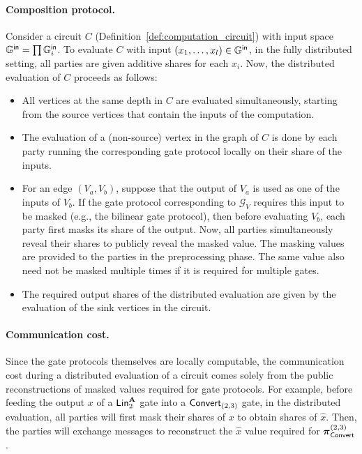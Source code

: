 
\paragraph{Composition protocol.} Consider a circuit $C$ (Definition~\ref{def:computation_circuit}) with input space $\mathbb{G}^{\textsf{in}} = \prod \mathbb{G}^{\textsf{in}}_i$. To evaluate $C$ with input $(x_1, \dots, x_l) \in \mathbb{G}^{\textsf{in}}$, in the fully distributed setting, all parties are given additive shares for each $x_i$. Now, the distributed evaluation of $C$ proceeds as follows:
\begin{itemize}
  
  \item All vertices at the same depth in $C$ are evaluated simultaneously, starting from the source vertices that contain the inputs of the computation. 

  \item The evaluation of a (non-source) vertex in the graph of $C$ is done by each party running the corresponding gate protocol locally on their share of the inputs. 

  \item For an edge $(V_a, V_b)$, suppose that the output of $V_a$ is used as one of the inputs of $V_b$. If the gate protocol corresponding to $\mathcal{G}_V$ requires this input to be masked (e.g., the bilinear gate protocol), then before evaluating $V_b$, each party first masks its share of the output. Now, all parties simultaneously reveal their shares to publicly reveal the masked value.   The masking values are provided to the parties in the preprocessing phase. The same value also need not be masked multiple times if it is required for multiple gates.

  \item The required output shares of the distributed evaluation are given by the evaluation of the sink vertices in the circuit.
\end{itemize}

\paragraph{Communication cost.}
Since the gate protocols themselves are locally computable, the communication cost during a distributed evaluation of a circuit comes solely from the public reconstructions of masked values required for gate protocols. For example, before feeding the output $x$ of a $\LMap^{\mat{A}}_2$ gate into a $\textnormal{\textsf{Convert}}_{(2,3)}$ gate, in the distributed evaluation, all parties will first mask their shares of $x$ to obtain shares of $\hat{x}$. Then, the parties will exchange messages to reconstruct the $\hat{x}$ value required for $\boldsymbol{\pi}_{\textnormal{\textsf{Convert}}}^{(2,3)}$.


